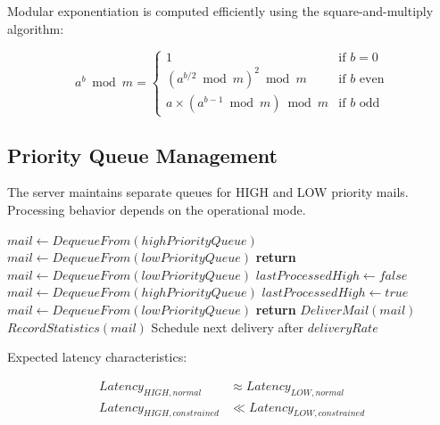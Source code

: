 \documentclass[12pt]{article}
\begin{document}
	Modular exponentiation is computed efficiently using the square-and-multiply algorithm:
	
	\begin{equation}
		a^b \bmod m = \begin{cases}
			1 & \text{if } b = 0 \\
			(a^{b/2} \bmod m)^2 \bmod m & \text{if } b \text{ even} \\
			a \times (a^{b-1} \bmod m) \bmod m & \text{if } b \text{ odd}
		\end{cases}
	\end{equation}
	
	\subsection{Priority Queue Management}
	
	The server maintains separate queues for HIGH and LOW priority mails. Processing behavior depends on the operational mode.
	
	\begin{algorithm}[H]
		\caption{Priority-Based Queue Processing}
		\label{alg:priority-queue}
		\begin{algorithmic}[1]
			\State {}
			\State $mail \gets DequeueFrom(highPriorityQueue)$
			\State $mail \gets DequeueFrom(lowPriorityQueue)$
			\Else
			\State \textbf{return} 
			\EndIf
			\Else
			\State {}
			\State $mail \gets DequeueFrom(lowPriorityQueue)$
			\State $lastProcessedHigh \gets false$
			\State $mail \gets DequeueFrom(highPriorityQueue)$
			\State $lastProcessedHigh \gets true$
			\State $mail \gets DequeueFrom(lowPriorityQueue)$
			\Else
			\State \textbf{return}
			\EndIf
			\EndIf
			\State $DeliverMail(mail)$
			\State $RecordStatistics(mail)$
			\State Schedule next delivery after $deliveryRate$
			\EndFunction
		\end{algorithmic}
	\end{algorithm}
	
	Expected latency characteristics:
	
	\begin{align}
		Latency_{HIGH, normal} &\approx Latency_{LOW, normal} \\
		Latency_{HIGH, constrained} &\ll Latency_{LOW, constrained}
	\end{align}
	
\end{document}
